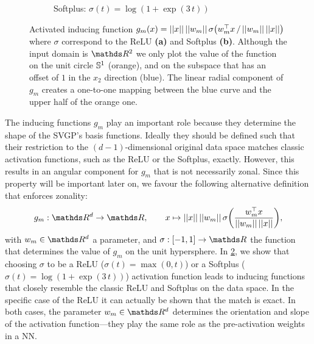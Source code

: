 \begin{figure}[t]
\begin{subfigure}[b]{0.49\textwidth}
        \caption{Softplus: $\sigma(t) = \log(1 + \exp(3\,t))$}
         \label{fig:projection:softplus}
     \end{subfigure}
   \caption{Activated inducing function ${g}_m(x) = \norm{x}\,\norm{w_m}\, \sigma\left( w_m^\top x \, / \, \norm{w_m}\,\norm{x}\right)$ where $\sigma$ correspond to the ReLU \textbf{(a)} and Softplus \textbf{(b)}. Although the input domain is $\Reals^2$ we only plot the value of the function on the unit circle $\mathbb{S}^1$ (orange), and on the subspace that has an offset of $1$ in the $x_2$ direction (blue). The linear radial component of ${g}_m$ creates a one-to-one mapping between the blue curve and the upper half of the orange one.}%
   \label{fig:projection}
\end{figure}

The inducing functions $g_m$ play an important role because they determine the shape of the SVGP's basis functions. Ideally they should be defined such that their restriction to the $(d - 1)$-dimensional original data space matches classic activation functions, such as the ReLU or the Softplus, exactly. However, this results in an angular component for $g_m$ that is not necessarily zonal. Since this property will be important later on, we favour the following alternative definition that enforces zonality:
\begin{equation}
\label{eq:def-inducing-function}
    g_m: \Reals^d \rightarrow \Reals,\qquad x \mapsto \norm{x}\,\norm{w_m}\, \sigma\left(\frac{w_m^\top x}{\norm{w_m}\,\norm{x}}\right), 
\end{equation}
with $w_m \in \Reals^d$ a parameter, and $\sigma: [-1, 1] \rightarrow \Reals$ the function that determines the value of $g_m$ on the unit hypersphere. In \cref{fig:projection}, we show that choosing $\sigma$ to be a ReLU ($\sigma(t) = \max(0, t)$) or a Softplus ($\sigma(t) = \log(1 + \exp(3\,t))$) activation function leads to inducing functions that closely resemble the classic ReLU and Softplus on the data space. In the specific case of the ReLU it can actually be shown that the match is exact. In both cases, the parameter $w_m \in \Reals^d$ determines the orientation and slope of the activation function---they play the same role as the pre-activation weights in a NN.

